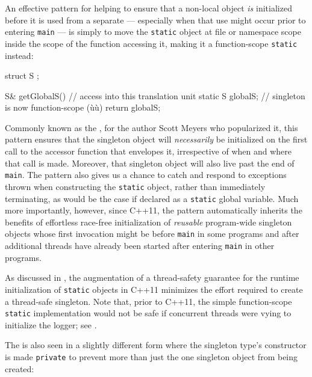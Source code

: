 An effective pattern for helping to ensure that a non-local object
\emph{is} initialized before it is used from a separate 
--- especially when that use might occur prior to entering \lstinline!main!
--- is simply to move the \lstinline!static! object at file or namespace
scope inside the scope of the function accessing it, making it a
function-scope \lstinline!static! instead:

\begin{emcppshiddenlisting}[emcppsbatch=e8]
struct S {
};
\end{emcppshiddenlisting}
\begin{emcppslisting}[emcppsbatch=e8]
S& getGlobalS()  // access into this translation unit
{
    static S globalS;  // singleton is now function-scope (ù{}ù)
    return globalS;
}
\end{emcppslisting}

\noindent Commonly known as the , for the
author Scott Meyers who popularized it, this pattern ensures that the
singleton object will \emph{necessarily} be initialized on the first
call to the accessor function that envelopes it, irrespective of when
and where that call is made. Moreover, that singleton object will also
live past the end of \lstinline!main!. The  pattern also gives us a chance to catch and respond to
exceptions thrown when constructing the \lstinline!static! object, rather
than immediately terminating, as would be the case if declared as a
\lstinline!static! global variable. Much more importantly, however, since C++11, the
 pattern automatically inherits the benefits of
effortless race-free initialization of \emph{reusable} program-wide
singleton objects whose first invocation might be before \lstinline!main!
in some programs and after additional threads have already been started
after entering \lstinline!main! in other programs.

As discussed in , the augmentation of a
thread-safety guarantee for the runtime initialization of
 \lstinline!static! objects in C++11 minimizes the
effort required to create a thread-safe singleton.  Note that, prior to C++11,
the simple function-scope \lstinline!static!
implementation would not be safe if concurrent threads were vying to
initialize the logger; see .

The  is also seen in a slightly different form
where the singleton type's constructor is made \lstinline!private! to
prevent more than just the one singleton object from being created:

